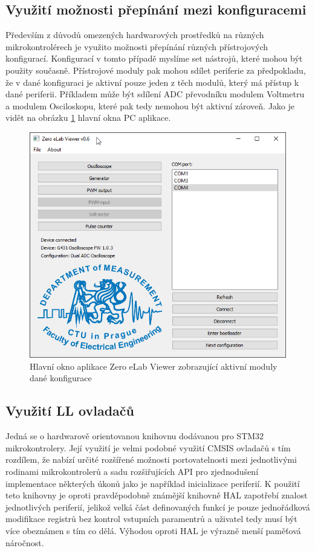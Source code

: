 \subsection{Využití možnosti přepínání mezi konfiguracemi}
Především z důvodů omezených hardwarových prostředků na různých mikrokontrolérech je využito možnosti přepínání různých přístrojových konfigurací. Konfigurací v tomto případě myslíme set nástrojů, které mohou být použity současně. Přístrojové moduly pak mohou sdílet periferie za předpokladu, že v dané konfiguraci je aktivní pouze jeden z těch modulů, který má přístup k dané periferii. Příkladem může být sdílení ADC převodníku modulem Voltmetru a modulem Osciloskopu, které pak tedy nemohou být aktivní zároveň. Jako je vidět na obrázku \ref{fig:zeroelab} hlavní okna PC aplikace.

\begin{figure}[H]
	\centering
	\includegraphics[width=0.7\linewidth]{Figs/Screenshots/ZeroElab}
	\caption{Hlavní okno aplikace Zero eLab Viewer zobrazující aktivní moduly dané konfigurace}
	\label{fig:zeroelab}
\end{figure}

\subsection{Využití LL ovladačů}
Jedná se o hardwarově orientovanou knihovnu dodávanou pro STM32 mikrokontrolery. Její využití je velmi podobné využití CMSIS ovladačů s tím rozdílem, že nabízí určité rozšířené možnosti portovatelnosti mezi jednotlivými rodinami mikrokontrolerů a sadu rozšiřujících API pro zjednodušení implementace některých úkonů jako je například inicializace periferií. K použití teto knihovny je oproti pravděpodobně známější knihovně HAL zapotřebí znalost jednotlivých periferií, jelikož velká část definovaných funkcí je pouze jednořádková modifikace registrů bez kontrol vstupních paramentrů a uživatel tedy musí být více obeznámen s tím co dělá. Výhodou oproti HAL je výrazně menší paměťová náročnost.\\

